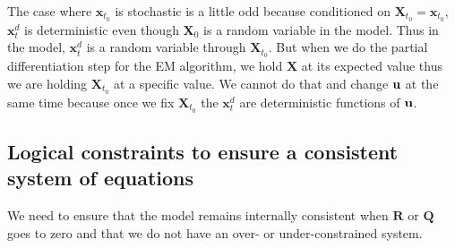 \documentclass[]{article}
\def\QQ{\mbox{$\mathbf Q$}}	 \def\qq{\mbox{$\mathbf q$}} \def\Qb{\mbox{$\mathbf G$}}  \def\Qm{\mathbb{Q}}
\def\RR{\mbox{$\mathbf R$}}	 \def\rr{\mbox{$\mathbf r$}} \def\Rb{\mbox{$\mathbf H$}}	\def\Rm{\mathbb{R}}
\def\XX{\mbox{$\pmb{X}$}}	\def\xx{\mbox{$\pmb{x}$}}
\begin{document}
The case where $\xx_{t_0}$ is stochastic is a little odd because conditioned on $\XX_{t_0}=\xx_{t_0}$, $\xx_t^d$ is deterministic even though $\XX_0$ is a random variable in the model.  Thus in the model, $\xx_t^d$ is a random variable through $\XX_{t_0}$.  But when we do the partial differentiation step for the EM algorithm, we hold $\XX$ at its expected value thus we are holding $\XX_{t_0}$ at a specific value.  We cannot do that and change $\mbox{$\mathbf u$}$ at the same time because once we fix $\XX_{t_0}$ the  $\xx_t^d$ are deterministic functions of $\mbox{$\mathbf u$}$.

\subsection{Logical constraints to ensure a consistent system of equations}
We need to ensure that the model remains internally consistent when $\RR$ or $\QQ$ goes to zero and that we do not have an over- or under-constrained system.
\end{document}

